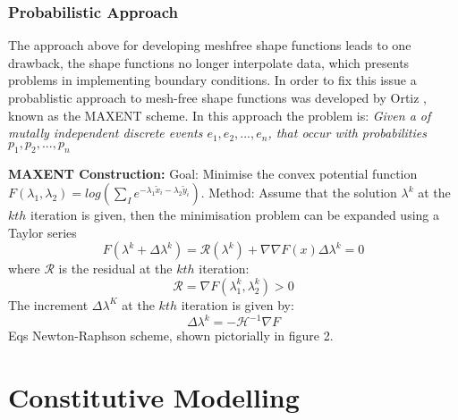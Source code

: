 \subsubsection*{Probabilistic Approach}
The approach above for developing meshfree shape functions leads to one drawback, the shape functions no longer interpolate data, which presents problems in implementing boundary conditions. In order to fix this issue a probablistic approach to mesh-free shape functions was developed by Ortiz \cite{}, known as the MAXENT scheme. In this approach the problem is: \emph{Given a of mutally independent discrete events $e_1,e_2,...,e_n$, that occur with probabilities $p_1,p_2,...,p_n$}
\begin{tcolorbox}
\textbf{MAXENT Construction:}
Goal: Minimise the convex potential function $F(\lambda_1,\lambda_2) = log(\sum_I e^{-\lambda_1 \tilde{x}_i - \lambda_2 \tilde{y}_i})$. Method: Assume that the solution $\lambda^k$ at the $kth$ iteration is given, then the minimisation problem can be expanded using a Taylor series
\begin{equation*}
F(\lambda^k+\Delta \lambda^k) = \mathcal{R}(\lambda^k) + \nabla \nabla F(x) \Delta \lambda^k = 0
\end{equation*}
where $\mathcal{R}$ is the residual at the $kth$ iteration:
\begin{equation*}
\mathcal{R} = \nabla F(\lambda_1^k,\lambda_2^k) > 0 
\end{equation*}
The increment $\Delta \lambda^K$ at the $kth$ iteration is given by:
\begin{equation*}
\Delta \lambda^k = -\mathcal{H}^{-1} \nabla F
\end{equation*}
Eqs Newton-Raphson scheme, shown pictorially in figure 2.
\end{tcolorbox}
\section{Constitutive Modelling}
